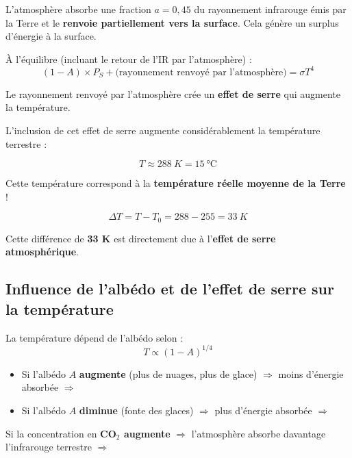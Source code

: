 L'atmosphère absorbe une fraction $a = 0,45$ du rayonnement infrarouge émis par la Terre et le \textbf{renvoie partiellement vers la surface}. Cela génère un surplus d'énergie à la surface.

 À l'équilibre (incluant le retour de l'IR par l'atmosphère) :
$$(1-A) \times P_S + \text{(rayonnement renvoyé par l'atmosphère)} = \sigma T^4$$

Le rayonnement renvoyé par l'atmosphère crée un \textbf{effet de serre} qui augmente la température.

 L'inclusion de cet effet de serre augmente considérablement la température terrestre :

$$\boxed{T \approx \SI{288}{K} = \SI{15}{\celsius}}$$

Cette température correspond à la \textbf{température réelle moyenne de la Terre} !

$$\Delta T = T - T_0 = 288 - 255 = \SI{33}{K}$$

Cette différence de \textbf{33 K} est directement due à l'\textbf{effet de serre atmosphérique}.

\subsection{Influence de l'albédo et de l'effet de serre sur la température}

 La température dépend de l'albédo selon :
$$T \propto (1-A)^{1/4}$$

\begin{itemize}
	\item Si l'albédo $A$ \textbf{augmente} (plus de nuages, plus de glace) $\Rightarrow$ moins d'énergie absorbée $\Rightarrow$ 
	\item Si l'albédo $A$ \textbf{diminue} (fonte des glaces) $\Rightarrow$ plus d'énergie absorbée $\Rightarrow$ 
\end{itemize}


Si la concentration en \textbf{CO$_2$ augmente} $\Rightarrow$ l'atmosphère absorbe davantage l'infrarouge terrestre $\Rightarrow$ 
%


